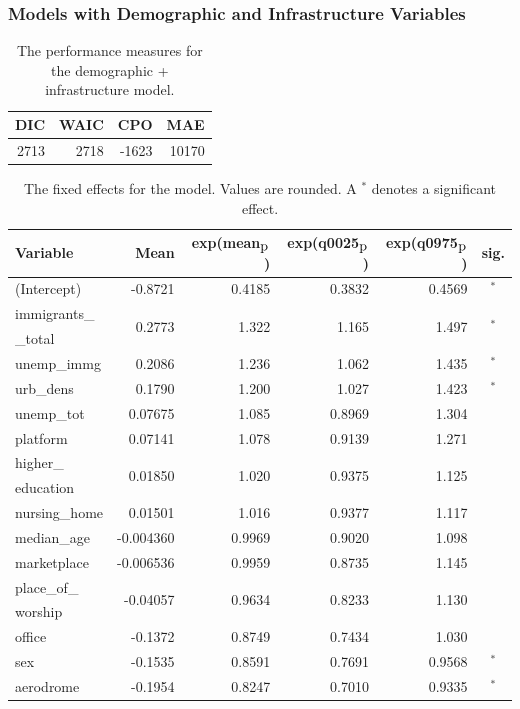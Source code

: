 \subsubsection{Models with Demographic and Infrastructure Variables}
\begin{table}[H] 
\caption{The performance measures for the demographic + infrastructure model. \label{allNorway_nospatial}}
\begin{tabular}{r r r r}
\toprule\textbf{DIC}	& \textbf{WAIC} & \textbf{CPO} & \textbf{MAE}\\
\midrule
2713 & 2718 & -1623 & 10170 \\
\bottomrule
\end{tabular}
\end{table} 
\begin{table}[H]
\caption{The fixed effects for the model. Values are rounded. A $^*$ denotes a significant effect. \label{fixedAllNorway_nospatial}}
\begin{tabular}{l r r r r c}
\toprule
\textbf{Variable}	& \textbf{Mean}	& \textbf{exp(mean$_{\hbox{p}}$)} & \textbf{exp(q0025$_{\hbox{p}}$)} & \textbf{exp(q0975$_{\hbox{p}}$)} & \textbf{sig.}\\
\midrule
(Intercept) & -0.8721 & 0.4185 & 0.3832 & 0.4569 & $^*$ \\
immigrants\_ & \multirow{2}{*}{0.2773}& \multirow{2}{*}{1.322}& \multirow{2}{*}{1.165}& \multirow{2}{*}{1.497}& \multirow{2}{*}{$^*$}\\
\_total \\
unemp\_immg & 0.2086 & 1.236 & 1.062 & 1.435 & $^*$ \\
urb\_dens & 0.1790 & 1.200 & 1.027 & 1.423 & $^*$ \\
unemp\_tot & 0.07675 & 1.085 & 0.8969 & 1.304 \\
platform & 0.07141 & 1.078 & 0.9139 & 1.271 \\
higher\_ & \multirow{2}{*}{0.01850}& \multirow{2}{*}{1.020}& \multirow{2}{*}{0.9375}& \multirow{2}{*}{1.125}\\ 
education \\
nursing\_home & 0.01501 & 1.016 & 0.9377 & 1.117 \\
median\_age & -0.004360  & 0.9969 & 0.9020 & 1.098 \\
marketplace & -0.006536 & 0.9959 & 0.8735 & 1.145 \\
place\_of\_ & \multirow{2}{*}{-0.04057}& \multirow{2}{*}{0.9634}& \multirow{2}{*}{0.8233}& \multirow{2}{*}{1.130} \\
worship \\
office & -0.1372 & 0.8749 & 0.7434 & 1.030 \\
sex & -0.1535 & 0.8591 & 0.7691 & 0.9568 & $^*$ \\
aerodrome & -0.1954 & 0.8247 & 0.7010 & 0.9335 & $^*$ \\
\bottomrule
\end{tabular}
\end{table}
\clearpage
